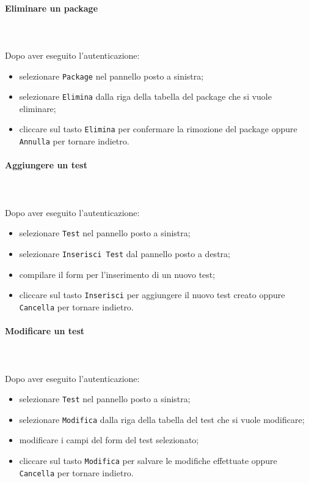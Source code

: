 	\paragraph{Eliminare un package} \mbox{}\\ \mbox{}\\
	Dopo aver eseguito l'autenticazione:
	\begin{itemize}
		\item selezionare \texttt{Package} nel pannello posto a sinistra;
		\item selezionare \texttt{Elimina} dalla riga della tabella del package 
		che si vuole eliminare;\
		\item cliccare sul tasto \texttt{Elimina} per confermare la rimozione del package
		oppure \texttt{Annulla} per tornare indietro.
	\end{itemize}
	
	\paragraph{Aggiungere un test} \mbox{}\\ \mbox{}\\
	Dopo aver eseguito l'autenticazione:
	\begin{itemize}
		\item selezionare \texttt{Test} nel pannello posto a sinistra;
		\item selezionare \texttt{Inserisci Test} dal pannello posto a destra;
		\item compilare il form per l'inserimento di un nuovo test;
		\item cliccare sul tasto \texttt{Inserisci} per aggiungere il nuovo test
		creato oppure \texttt{Cancella} per tornare indietro.	
	\end{itemize}
	
	\paragraph{Modificare un test} \mbox{}\\ \mbox{}\\
	Dopo aver eseguito l'autenticazione:
	\begin{itemize}
		\item selezionare \texttt{Test} nel pannello posto a sinistra;
		\item selezionare \texttt{Modifica} dalla riga della tabella del test
		che si vuole modificare;
		\item modificare i campi del form del test selezionato;
		\item cliccare sul tasto \texttt{Modifica} per salvare le modifiche effettuate
		oppure \texttt{Cancella} per tornare indietro.
	\end{itemize}
	
